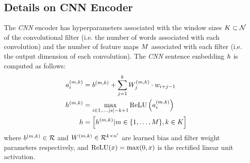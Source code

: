 \begin{toappendix}
\section{Details on CNN Encoder} \label{app:cnnencoder}
The \textit{CNN} encoder has hyperparameters
associated with the window sizes $K \subset \mathcal{N}$ of the convolutional filter 
(i.e. the number of words associated with each convolution) and the number of 
feature maps $M$ associated with each filter
(i.e. the output dimension of each 
convolution). 
The \textit{CNN} sentence embedding $\sentEmb$ is computed as follows:
\begin{align}
 \specActivation_i &= \specConvBias 
    + \sum^\filterWindowSize_{j=1} \specConvWeight_j \cdot \wemb_{i + j -1}\\
  \specFeatureMap &= \max_{i\in 1,\dots, |\sent| - \filterWindowSize + 1} 
                      \relu\left(\specActivation_i\right) \\
 \sentEmb &= \left[\specFeatureMap | 
   \numFeatureMaps \in \{1, \ldots, \maxFeatureMaps\},
   \filterWindowSize \in \maxWindowSize
   \right]
\end{align}
where $b^{(m,k)}\in\mathcal{R}$ and $W^{(m,k)} \in 
\mathcal{R}^{k \times {n^\prime}}$ are learned bias and filter
weight parameters respectively, and $\operatorname{ReLU}(x) = \max(0, x)$ is the rectified
linear unit activation.
\end{toappendix}


